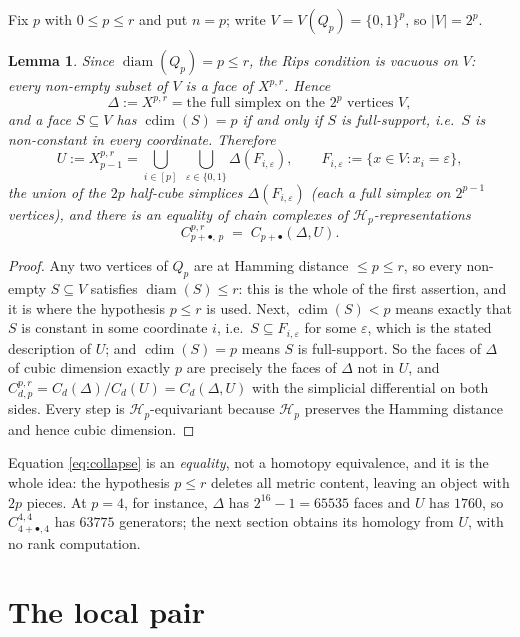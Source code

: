 \documentclass[11pt]{amsart}
\newtheorem{lemma}[theorem]{Lemma}
\theoremstyle{definition}
\theoremstyle{remark}
\DeclareMathOperator{\diam}{diam}
\DeclareMathOperator{\cdim}{cdim}
\newcommand{\Hy}{\mathcal H}
\newcommand{\bl}{\bullet}
\numberwithin{equation}{section}
\begin{document}
Fix $p$ with $0\le p\le r$ and put $n=p$; write $V=V(Q_p)=\{0,1\}^p$, so
$|V|=2^p$.

\begin{lemma}\label{lem:collapse}
Since $\diam(Q_p)=p\le r$, the Rips condition is vacuous on $V$: every
non-empty subset of $V$ is a face of $X^{p,r}$. Hence
\[
  \Delta:=X^{p,r}=\text{the full simplex on the $2^p$ vertices $V$},
\]
and a face $S\subseteq V$ has $\cdim(S)=p$ if and only if $S$ is
\emph{full-support}, i.e.\ $S$ is non-constant in every coordinate. Therefore
\[
  U:=X^{p,r}_{p-1}
   =\bigcup_{i\in[p]}\;\bigcup_{\varepsilon\in\{0,1\}}\Delta(F_{i,\varepsilon}),
  \qquad F_{i,\varepsilon}:=\{x\in V: x_i=\varepsilon\},
\]
the union of the $2p$ \emph{half-cube simplices} $\Delta(F_{i,\varepsilon})$
\textup{(}each a full simplex on $2^{p-1}$ vertices\textup{)}, and there is an
equality of chain complexes of $\Hy_p$-representations
\begin{equation}\label{eq:collapse}
  C^{p,r}_{p+\bl,\,p}\;=\;C_{p+\bl}(\Delta,U).
\end{equation}
\end{lemma}

\begin{proof}
Any two vertices of $Q_p$ are at Hamming distance $\le p\le r$, so every
non-empty $S\subseteq V$ satisfies $\diam(S)\le r$: this is the whole of the
first assertion, and it is where the hypothesis $p\le r$ is used. Next,
$\cdim(S)<p$ means exactly that $S$ is constant in some coordinate $i$, i.e.\
$S\subseteq F_{i,\varepsilon}$ for some $\varepsilon$, which is the stated
description of $U$; and $\cdim(S)=p$ means $S$ is full-support. So the faces of
$\Delta$ of cubic dimension exactly $p$ are precisely the faces of $\Delta$ not
in $U$, and $C^{p,r}_{d,p}=C_d(\Delta)/C_d(U)=C_d(\Delta,U)$ with the
simplicial differential on both sides. Every step is $\Hy_p$-equivariant
because $\Hy_p$ preserves the Hamming distance and hence cubic dimension.
\end{proof}

Equation \eqref{eq:collapse} is an \emph{equality}, not a homotopy
equivalence, and it is the whole idea: the hypothesis $p\le r$ deletes all
metric content, leaving an object with $2p$ pieces. At $p=4$, for instance,
$\Delta$ has $2^{16}-1=65535$ faces and $U$ has $1760$, so
$C^{4,4}_{4+\bl,4}$ has $63775$ generators; the next section obtains its
homology from $U$, with no rank computation.

\section{The local pair}\label{sec:termwise}
\end{document}
